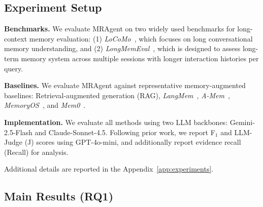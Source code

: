 \subsection{Experiment Setup}
\textbf{Benchmarks.} 
We evaluate MRAgent on two widely used benchmarks for long-context memory evaluation:
(1) \emph{LoCoMo}~\cite{DBLP:conf/acl/MaharanaLTBBF24}, which focuses on long conversational memory understanding, and 
(2) \emph{LongMemEval}~\cite{DBLP:conf/iclr/WuWYZCY25}, which is designed to assess long-term memory system across multiple sessions with longer interaction histories per query.

\textbf{Baselines.} 
We evaluate MRAgent against representative memory-augmented baselines: Retrieval-augmented generation (RAG), \emph{LangMem}~\cite{langmem2025}, \emph{A-Mem}~\cite{DBLP:journals/corr/abs-2502-12110}, \emph{MemoryOS}~\cite{DBLP:journals/corr/abs-2506-06326}, and \emph{Mem0}~\cite{DBLP:journals/corr/abs-2504-19413}.

\textbf{Implementation.} 
We evaluate all methods using two LLM backbones: Gemini-2.5-Flash and Claude-Sonnet-4.5. 
Following prior work, we report F$_1$ and LLM-Judge (J) scores using GPT-4o-mini, and additionally report evidence recall (Recall) for analysis.

Additional details are reported in the Appendix~\ref{app:experiments}.


\subsection{Main Results (RQ1)}

